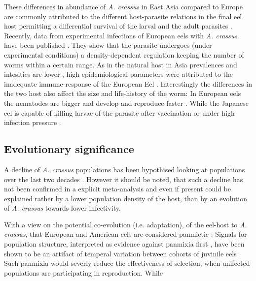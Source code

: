 These differences in abundance of \textit{A. crassus} in East Asia
compared to Europe are commonly attributed to the different
host-parasite relations in the final eel host permitting a
differential survival of the larval and the adult parasites
\cite{knopf_differences_2004}. Recently, data from experimental
infections of European eels with \textit{A. crassus} have been
published \cite{fazio_regulation_2008}. They show that the parasite
undergoes (under experimental conditions) a density-dependent
regulation keeping the number of worms within a certain range. As in
the natural host in Asia prevalences and intesities are lower
\cite{mnderle_occurrence_2006}, high epidemiological parameters were
attributed to the inadequate immune-response of the European Eel
\cite{knopf_swimbladder_2006}. Interestingly the differences in the
two host also affect the size and life-history of the worm: In
European eels the nematodes are bigger and develop and reproduce
faster \cite{knopf_differences_2004}.  While the Japanese eel is
capable of killing larvae of the parasite after vaccination
\cite{knopf_vaccination_2008} or under high infection pressure
\cite{heitlinger_massive_2009}.



\subsection{Evolutionary significance}
\label{ev-sig}

A decline of \textit{A. crassus} populations has been hypothised
looking at populations over the last two decades
\cite{lefebvre_anguillicolosis:_2004}. However it should be noted,
that such a decline has not been confirmed in a explicit meta-analysis
and even if present could be explained rather by a lower population
density of the host, than by an evolution of \textit{A. crassus}
towards lower infectivity.

With a view on the potential co-evolution (i.e. adaptation), of the
eel-host to \textit{A. crassus}, that European and American eels are
considered panmictic \cite{pmid20735687}: Signals for population
structure, interpreted as evidence against panmixia first
\cite{pmid11234011}, have been shown to be an artifact of temperal
variation between cohorts of juvinile eels \cite{pmid19417764,
  pmid21299662, pmid16024374}. Such panmixia would severly reduce the
effectiveness of selection, when unifected populations are
participating in reproduction. While 


